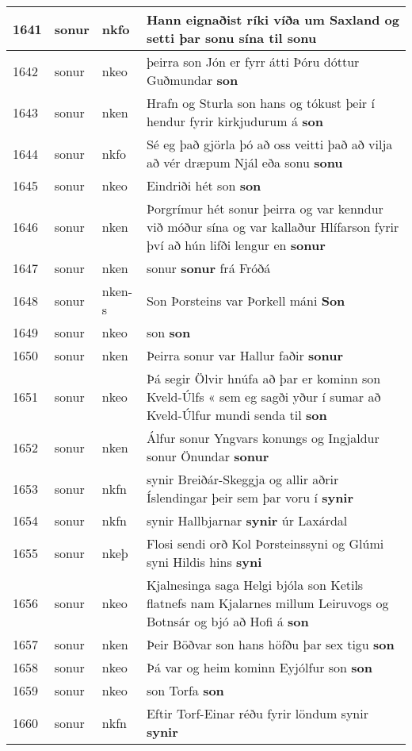 \documentclass{article}
\begin{document}
\begin{longtable}{p{1cm}|p{1cm}|p{1cm}|p{13cm}}
\hline
1641&sonur&nkfo&Hann eignaðist ríki víða um Saxland og setti þar sonu sína til \textbf{sonu} \\
\hline
1642&sonur&nkeo&þeirra son Jón er fyrr átti Þóru dóttur Guðmundar \textbf{son} \\
\hline
1643&sonur&nken&Hrafn og Sturla son hans og tókust þeir í hendur fyrir kirkjudurum á \textbf{son} \\
\hline
1644&sonur&nkfo&Sé eg það gjörla þó að oss veitti það að vilja að vér dræpum Njál eða sonu \textbf{sonu} \\
\hline
1645&sonur&nkeo&Eindriði hét son \textbf{son} \\
\hline
1646&sonur&nken&Þorgrímur hét sonur þeirra og var kenndur við móður sína og var kallaður Hlífarson fyrir því að hún lifði lengur en \textbf{sonur} \\
\hline
1647&sonur&nken&sonur \textbf{sonur} frá Fróðá\\
\hline
1648&sonur&nken-s&Son Þorsteins var Þorkell máni \textbf{Son} \\
\hline
1649&sonur&nkeo&son \textbf{son} \\
\hline
1650&sonur&nken&Þeirra sonur var Hallur faðir \textbf{sonur} \\
\hline
1651&sonur&nkeo&Þá segir Ölvir hnúfa að þar er kominn son Kveld-Úlfs « sem eg sagði yður í sumar að Kveld-Úlfur mundi senda til \textbf{son} \\
\hline
1652&sonur&nken&Álfur sonur Yngvars konungs og Ingjaldur sonur Önundar \textbf{sonur} \\
\hline
1653&sonur&nkfn&synir Breiðár-Skeggja og allir aðrir Íslendingar þeir sem þar voru í \textbf{synir} \\
\hline
1654&sonur&nkfn&synir Hallbjarnar \textbf{synir} úr Laxárdal\\
\hline
1655&sonur&nkeþ&Flosi sendi orð Kol Þorsteinssyni og Glúmi syni Hildis hins \textbf{syni} \\
\hline
1656&sonur&nkeo&Kjalnesinga saga Helgi bjóla son Ketils flatnefs nam Kjalarnes millum Leiruvogs og Botnsár og bjó að Hofi á \textbf{son} \\
\hline
1657&sonur&nken&Þeir Böðvar son hans höfðu þar sex tigu \textbf{son} \\
\hline
1658&sonur&nkeo&Þá var og heim kominn Eyjólfur son \textbf{son} \\
\hline
1659&sonur&nkeo&son Torfa \textbf{son} \\
\hline
1660&sonur&nkfn&Eftir Torf-Einar réðu fyrir löndum synir \textbf{synir} \\

\end{longtable}
\end{document}
